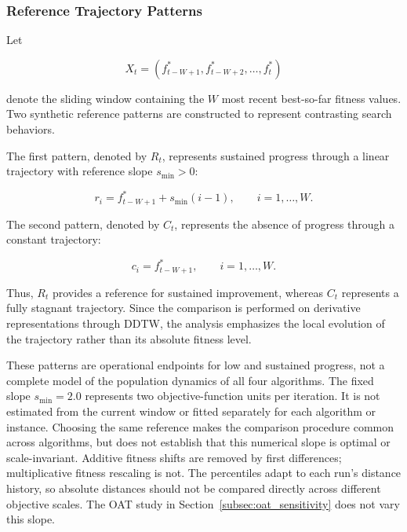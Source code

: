 \documentclass[journal,article,submit,moreauthors]{Definitions/mdpi}
\begin{document}
\subsubsection{Reference Trajectory Patterns}

Let

\begin{equation}
X_t =
\left(
f_{t-W+1}^*,
f_{t-W+2}^*,
\dots,
f_t^*
\right)
\label{eq:trajectory_window}
\end{equation}

denote the sliding window containing the $W$ most recent best-so-far fitness
values. Two synthetic reference patterns are constructed to represent
contrasting search behaviors.

The first pattern, denoted by $R_t$, represents sustained progress through
a linear trajectory with reference slope $s_{\min}>0$:

\begin{equation}
r_i =
f_{t-W+1}^*
+
s_{\min}(i-1),
\qquad i=1,\ldots,W.
\label{eq:ramp_pattern}
\end{equation}

The second pattern, denoted by $C_t$, represents the absence of progress
through a constant trajectory:

\begin{equation}
c_i =
f_{t-W+1}^*,
\qquad i=1,\ldots,W.
\label{eq:constant_pattern}
\end{equation}

Thus, $R_t$ provides a reference for sustained improvement, whereas $C_t$
represents a fully stagnant trajectory. Since the comparison is performed
on derivative representations through DDTW, the analysis emphasizes the
local evolution of the trajectory rather than its absolute fitness level.

These patterns are operational endpoints for low and sustained progress,
not a complete model of the population dynamics of all four algorithms.
The fixed slope $s_{\min}=2.0$ represents two objective-function units per
iteration. It is not estimated from the current window or fitted separately
for each algorithm or instance. Choosing the same reference makes the
comparison procedure common across algorithms, but does not establish that
this numerical slope is optimal or scale-invariant. Additive fitness shifts
are removed by first differences; multiplicative fitness rescaling is not.
The percentiles adapt to each run's distance history, so absolute distances
should not be compared directly across different objective scales. The OAT
study in Section~\ref{subsec:oat_sensitivity} does not vary this slope.
\end{document}
